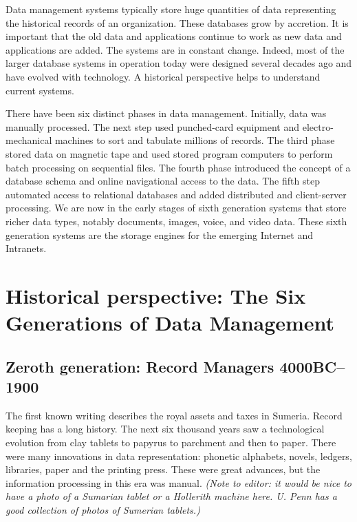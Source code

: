 \documentclass[a4paper,12pt,notitlepage,twoside,openright]{article}
\begin{document}
Data management systems typically store huge quantities of data
representing the historical records of an organization. These databases
grow by accretion. It is important that the old data and applications
continue to work as new data and applications are added. The systems are
in constant change. Indeed, most of the larger database systems in
operation today were designed several decades ago and have evolved with
technology. A historical perspective helps to understand current
systems.

There have been six distinct phases in data management. Initially, data
was manually processed. The next step used punched-card equipment and
electro-mechanical machines to sort and tabulate millions of records.
The third phase stored data on magnetic tape and used stored program
computers to perform batch processing on sequential files. The fourth
phase introduced the concept of a database schema and online
navigational access to the data. The fifth step automated access to
relational databases and added distributed and client-server processing.
We are now in the early stages of sixth generation systems that store
richer data types, notably documents, images, voice, and video data.
These sixth generation systems are the storage engines for the emerging
Internet and Intranets.

\hypertarget{historical-perspective-the-six-generations-of-data-management}{%
\section{Historical perspective: The Six Generations of Data
Management}\label{historical-perspective-the-six-generations-of-data-management}}

\hypertarget{zeroth-generation-record-managers-4000bc--1900}{%
\subsection{Zeroth generation: Record Managers 4000BC--1900}\label{zeroth-generation-record-managers-4000bc--1900}}

The first known writing describes the royal assets and taxes in Sumeria.
Record keeping has a long history. The next six thousand years saw a
technological evolution from clay tablets to papyrus to parchment and
then to paper. There were many innovations in data representation:
phonetic alphabets, novels, ledgers, libraries, paper and the printing
press. These were great advances, but the information processing in this
era was manual. \emph{(Note to editor: it would be nice to have a photo
of a Sumarian tablet or a Hollerith machine here. U. Penn has a good
collection of photos of Sumerian tablets.)}
\end{document}
